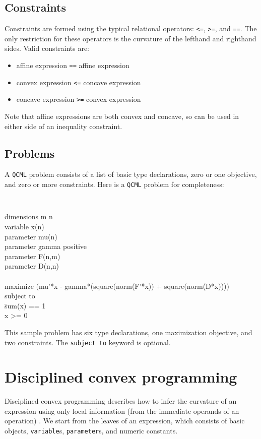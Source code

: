 \documentclass[11pt]{article}
\def\qcml{\texttt{QCML}\xspace}
\begin{document}
\subsection{Constraints}
Constraints are formed using the typical relational operators: {\tt <=},
{\tt >=}, and {\tt ==}. The only restriction for these operators is the 
curvature of the lefthand and righthand sides. Valid constraints are:
\begin{itemize}
\item affine expression {\tt ==} affine expression
\item convex expression {\tt <=} concave expression
\item concave expression {\tt >=} convex expression
\end{itemize}

Note that affine expressions are both convex and concave, so can be used
in either side of an inequality constraint.

\subsection{Problems}
A \qcml problem consists of a list of basic type declarations, zero or one
objective, and zero or more constraints. Here is a \qcml problem for
completeness:
{\tt
\begin{tabbing}
\qquad 
\= dimensions m n \\
\> variable x(n) \\
\> parameter mu(n)\\ 
\> parameter gamma positive\\
\> parameter F(n,m) \\
\> parameter D(n,n) \\
\\
\> maximize (mu'*x - gamma*(square(norm(F'*x)) + square(norm(D*x)))) \\
\> subject to \\
\> \qquad \= sum(x) == 1 \\
\> \> x >= 0
\end{tabbing}
}
This sample problem has six type declarations, one maximization objective, and
two constraints. The {\tt subject to} keyword is optional.

\section{Disciplined convex programming}
\label{s-ug-dcp}
Disciplined convex programming describes how to infer the curvature of an
expression using only local information (from the immediate operands of an
operation) \cite{CVX}. We start from the leaves of an expression, which consists
of basic objects, {\tt variable}s, {\tt parameter}s, and numeric constants.
\end{document}
